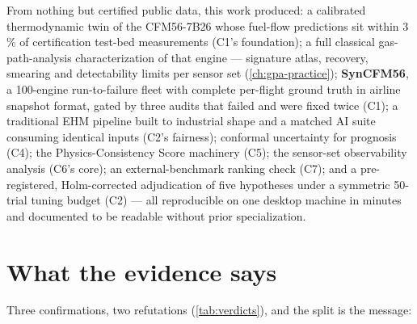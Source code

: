 From nothing but certified public data, this work produced: a calibrated thermodynamic twin
of the CFM56-7B26 whose fuel-flow predictions sit within 3\,\% of certification test-bed
measurements (C1's foundation); a full classical gas-path-analysis characterization of that
engine --- signature atlas, recovery, smearing and detectability limits per sensor set
(\cref{ch:gpa-practice}); \textbf{SynCFM56}, a 100-engine run-to-failure fleet with
complete per-flight ground truth in airline snapshot format, gated by three audits that
failed and were fixed twice (C1); a traditional EHM pipeline built to industrial shape and a
matched AI suite consuming identical inputs (C2's fairness); conformal uncertainty for
prognosis (C4); the Physics-Consistency Score machinery (C5); the sensor-set observability
analysis (C6's core); an external-benchmark ranking check (C7); and a pre-registered,
Holm-corrected adjudication of five hypotheses under a symmetric 50-trial tuning budget (C2)
--- all reproducible on one desktop machine in minutes and documented to be readable without
prior specialization.

\section{What the evidence says}

Three confirmations, two refutations (\cref{tab:verdicts}), and the split is the message:

